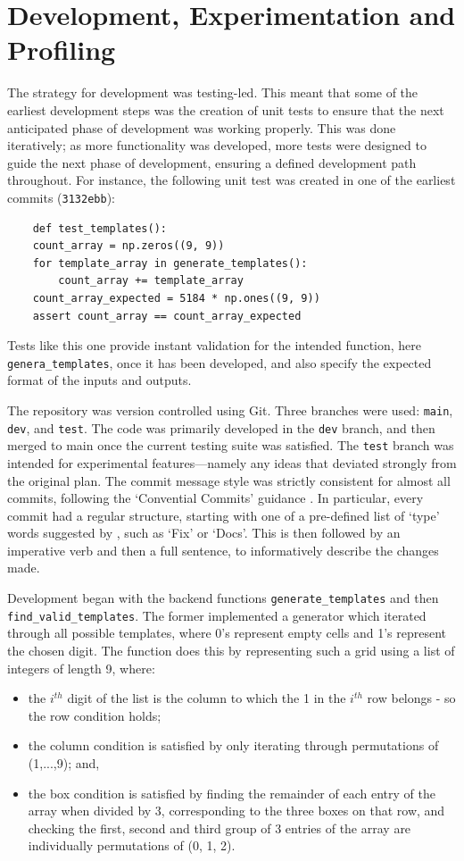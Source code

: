 \documentclass[12pt]{article}
\begin{document}
\section*{Development, Experimentation and Profiling}
The strategy for development was testing-led.
This meant that some of the earliest development steps was the creation of unit tests to ensure that the next anticipated phase of development was working properly.
This was done iteratively; as more functionality was developed, more tests were designed to guide the next phase of development, ensuring a defined development path throughout.
For instance, the following unit test was created in one of the earliest commits (\texttt{3132ebb}):

\begin{lstlisting}
    def test_templates():
    count_array = np.zeros((9, 9))
    for template_array in generate_templates():
        count_array += template_array
    count_array_expected = 5184 * np.ones((9, 9))
    assert count_array == count_array_expected
\end{lstlisting}

Tests like this one provide instant validation for the intended function, here \texttt{genera\_templates}, once it has been developed, and also specify the expected format of the inputs and outputs.

The repository was version controlled using Git.
Three branches were used: \texttt{main}, \texttt{dev}, and \texttt{test}.
The code was primarily developed in the \texttt{dev} branch, and then merged to main once the current testing suite was satisfied.
The \texttt{test} branch was intended for experimental features---namely any ideas that deviated strongly from the original plan.
The commit message style was strictly consistent for almost all commits, following the `Convential Commits' guidance \cite{ccommits}.
In particular, every commit had a regular structure, starting with one of a pre-defined list of `type' words suggested by \cite{ccommits}, such as `Fix' or `Docs'.
This is then followed by an imperative verb and then a full sentence, to informatively describe the changes made.

Development began with the backend functions \texttt{generate\_templates} and then \texttt{find\_valid\_templates}.
The former implemented a generator which iterated through all possible templates, where 0's represent empty cells and 1's represent the chosen digit.
The function does this by representing such a grid using a list of integers of length 9, where:
\begin{itemize}
    \item the $i^{th}$ digit of the list is the column to which the 1 in the $i^{th}$ row belongs - so the row condition holds;
    \item the column condition is satisfied by only iterating through permutations of (1,...,9); and,
    \item the box condition is satisfied by finding the remainder of each entry of the array when divided by 3, corresponding to the three boxes on that row, and checking the first, second and third group of 3 entries of the array are individually permutations of (0, 1, 2).
\end{itemize}
\end{document}
